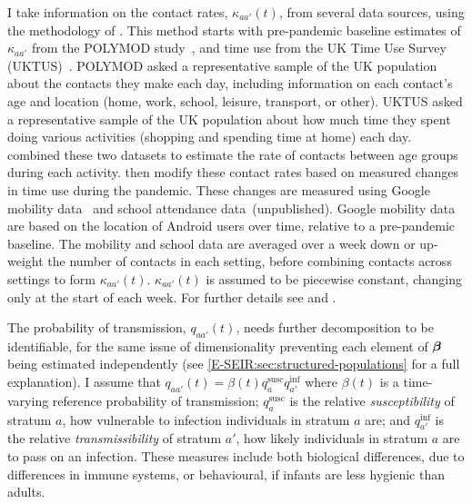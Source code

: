 \documentclass[thesis.tex]{subfiles}
\begin{document}
I take information on the contact rates, $\kappa_{aa'}(t)$, from several data sources, using the methodology of \textcite{vanleeuwenTime,vanleeuwenAugmenting}.
This method starts with pre-pandemic baseline estimates of $\kappa_{aa'}$ from the POLYMOD study~\autocite{mossongSocial}, and time use from the UK Time Use Survey (UKTUS)~\autocite{UKTUS}.
POLYMOD asked a representative sample of the UK population about the contacts they make each day, including information on each contact's age and location (home, work, school, leisure, transport, or other).
UKTUS asked a representative sample of the UK population about how much time they spent doing various activities (\eg shopping and spending time at home) each day.
\Textcite{vanleeuwenAugmenting} combined these two datasets to estimate the rate of contacts between age groups during each activity.
\Textcite{birrellRealtime} then modify these contact rates based on measured changes in time use during the pandemic.
These changes are measured using Google mobility data~\autocite{googleCOVID19} and school attendance data~(unpublished).
Google mobility data are based on the location of Android users over time, relative to a pre-pandemic baseline.
The mobility and school data are averaged over a week down or up-weight the number of contacts in each setting, before combining contacts across settings to form $\kappa_{aa'}(t)$.
$\kappa_{aa'}(t)$ is assumed to be piecewise constant, changing only at the start of each week.
For further details see \textcite{vanleeuwenAugmenting} and \textcite[supplementary material]{birrellRealtime}.

The probability of transmission, $q_{aa'}(t)$, needs further decomposition to be identifiable, for the same issue of dimensionality preventing each element of $\bm{\beta}$ being estimated independently (see \cref{E-SEIR:sec:structured-populations} for a full explanation).
I assume that $q_{aa'}(t) = \beta(t) q^\text{susc}_{a} q^\text{inf}_{a'}$ where $\beta(t)$ is a time-varying reference probability of transmission; $q^\text{susc}_a$ is the relative \emph{susceptibility} of stratum $a$, \ie how vulnerable to infection individuals in stratum $a$ are; and $q^\text{inf}_{a'}$ is the relative \emph{transmissibility} of stratum $a'$, \ie how likely individuals in stratum $a$ are to pass on an infection.
These measures include both biological differences, \eg due to differences in immune systems, or behavioural, \eg if infants are less hygienic than adults.
\end{document}
